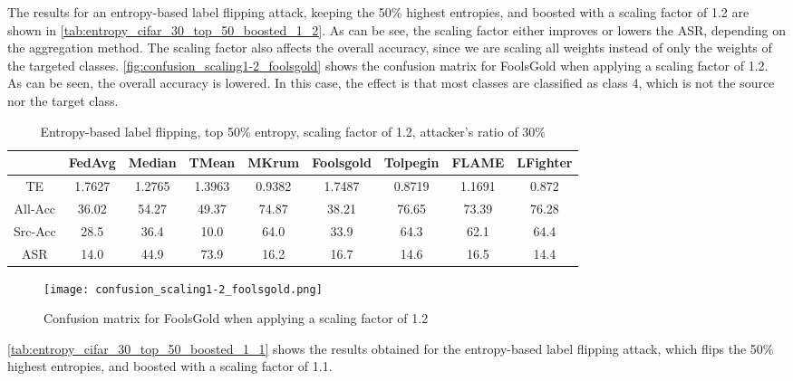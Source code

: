 The results for an entropy-based label flipping attack, keeping the 50\% highest entropies, and boosted with a scaling factor of 1.2 are shown in \autoref{tab:entropy_cifar_30_top_50_boosted_1_2}.
As can be see, the scaling factor either improves or lowers the ASR, depending on the aggregation method. 
The scaling factor also affects the overall accuracy, since we are scaling all weights instead of only the weights of the targeted classes. \autoref{fig:confusion_scaling1-2_foolsgold} shows the confusion matrix for FoolsGold when applying a scaling factor of 1.2. As can be seen, the overall accuracy is lowered. In this case, the effect is that most classes are classified as class 4, which is not the source nor the target class.
\begin{table}[h!]
        \centering
        \small
        \begin{adjustbox}{center}
        \begin{tabular}{|c|c|c|c|c|c|c|c|c|}
            \hline
            & FedAvg & Median & TMean & MKrum & Foolsgold & Tolpegin & FLAME & LFighter \\
            \hline
            TE & 1.7627 & 1.2765 & 1.3963 & 0.9382 & 1.7487 & 0.8719 & 1.1691 & 0.872 \\
            \hline
            All-Acc & 36.02 & 54.27 & 49.37 & 74.87 & 38.21 & 76.65 & 73.39 & 76.28 \\
            \hline
            Src-Acc & 28.5 & 36.4 & 10.0 & 64.0 & 33.9 & 64.3 & 62.1 & 64.4 \\
            \hline
            ASR & 14.0 & 44.9 & 73.9 & 16.2 & 16.7 & 14.6 & 16.5 & 14.4 \\
            \hline
        \end{tabular}
        \end{adjustbox}
        \caption{Entropy-based label flipping, top 50\% entropy, scaling factor of 1.2, attacker's ratio of 30\%}
        \label{tab:entropy_cifar_30_top_50_boosted_1_2}
    \end{table}
    

\begin{figure}[h!]
        \centering
        \texttt{[image: confusion\_scaling1-2\_foolsgold.png]}
        \caption{Confusion matrix for FoolsGold when applying a scaling factor of 1.2}
        \label{fig:confusion_scaling1-2_foolsgold}
\end{figure}

\autoref{tab:entropy_cifar_30_top_50_boosted_1_1} shows the results obtained for the entropy-based label flipping attack, which flips the 50\% highest entropies, and boosted with a scaling factor of 1.1.

